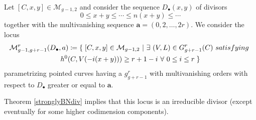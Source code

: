 \documentclass{article}
\theoremstyle{plain}
\theoremstyle{definition}
\def\cM{\mathcal{M}}
\begin{document}
Let $[C,x,y] \in \cM_{g-1,2}$ and consider the sequence $D_{\bullet}(x,y)$ of divisors
\[ 0 \leq x+y\leq \cdots \leq n(x+y) \leq \cdots   \]
together with the multivanishing sequence $\textbf{a} = (0,2,\ldots, 2r)$. We consider the locus
\begin{multline*} \cM^r_{g-1, g+r-1}\text{\large (}D_{\bullet}, \textbf{a}\text{\large )} \coloneqq \left\{ \right. [C,x,y] \in \cM_{g-1,2} \ | \ \exists \ (V,L)\in G^r_{g+r-1}(C) \ \textrm{satisfying} \ \\  h^0\text{\Large (}C,V(-i(x+y))\text{\Large )} \geq r+1-i \ \forall \ 0\leq i \leq r \left.\right\} 
\end{multline*}
parametrizing pointed curves having a $g^r_{g+r-1}$ with multivanishing orders with respect to $D_{\bullet}$ greater or equal to $\textbf{a}$.

Theorem \ref{stronglyBNdiv} implies that this locus is an irreducible divisor (except eventually for some higher codimension components).
\end{document}
